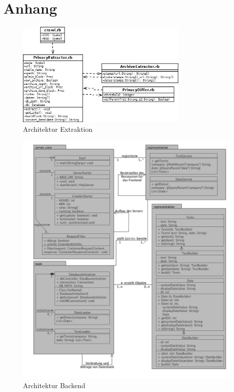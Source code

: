 \documentclass{article}
\begin{document}
	\section{Anhang}
	\begin{figure}[ht]
		\centering
		
		\includegraphics[width=0.75\textwidth]{extraction}
		\caption{Architektur Extraktion}
		\label{fig:uml-ex}
	\end{figure}
	\newpage
	\begin{figure}[ht]
		\centering
		
		\includegraphics[width=1\textwidth]{tmc_backend}
		\caption{Architektur Backend}
		\label{fig:uml-ex}
	\end{figure}
\end{document}
